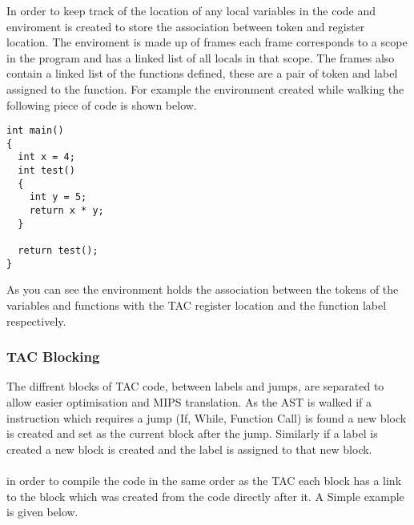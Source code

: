 \documentclass{article}
\begin{document}
In order to keep track of the location of any local variables in the code and enviroment
is created to store the association between token and register location. The enviroment
is made up of frames each frame corresponds to a scope in the program and has
a linked list of all locals in that scope. The frames also contain a linked list of
the functions defined, these are a pair of token and label assigned to the function.
For example the environment created while walking the following piece of code is shown below.

\begin{lstlisting}
int main()
{
  int x = 4;
  int test()
  {
    int y = 5;
    return x * y;
  }

  return test();
}
\end{lstlisting}


As you can see the environment holds the association between the tokens of the variables
and functions with the TAC register location and the function label respectively.

\subsubsection{TAC Blocking}

The diffrent blocks of TAC code, between labels and jumps, are separated to allow
easier optimisation and MIPS translation. As the AST is walked if a instruction which
requires a jump (If, While, Function Call) is found a new block is created and set as the
current block after the jump. Similarly if a label is created a new block is created
and the label is assigned to that new block.\\~\\
in order to compile the code in the same order as the TAC each block has a link to
the block which was created from the code directly after it. A Simple example is
given below.\\~\\

\begin{center}
\end{center}
\end{document}

